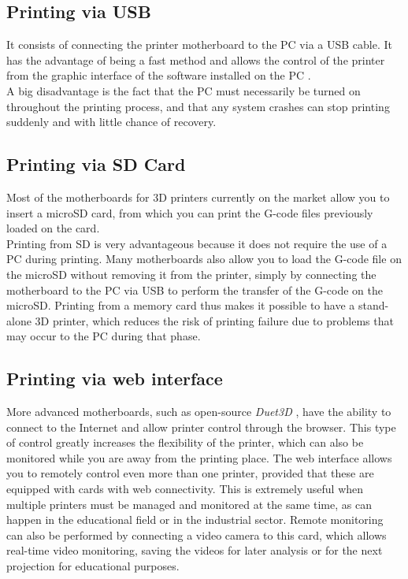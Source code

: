\subsection{Printing via USB}
It consists of connecting the printer motherboard to the PC via a USB cable.
It has the advantage of being a fast method and allows the control of the printer from the graphic interface of the software installed on the PC \parencite{Reference2}. \\
A big disadvantage is the fact that the PC must necessarily be turned on throughout the printing process, and that any system crashes can stop printing suddenly and with little chance of recovery.

\subsection{Printing via SD Card}
Most of the motherboards for 3D printers currently on the market allow you to insert a microSD card, from which you can print the G-code files previously loaded on the card. \\
Printing from SD is very advantageous because it does not require the use of a PC during printing.
Many motherboards also allow you to load the G-code file on the microSD without removing it from the printer, simply by connecting the motherboard to the PC via USB to perform the transfer of the G-code on the microSD.
Printing from a memory card thus makes it possible to have a stand-alone 3D printer, which reduces the risk of printing failure due to problems that may occur to the PC during that phase.

\subsection{Printing via web interface}
More advanced motherboards, such as open-source \emph{Duet3D} \parencite{Reference3}, have the ability to connect to the Internet and allow printer control through the browser. This type of control greatly increases the flexibility of the printer, which can also be monitored while you are away from the printing place.
The web interface allows you to remotely control even more than one printer, provided that these are equipped with cards with web connectivity. This is extremely useful when multiple printers must be managed and monitored at the same time, as can happen in the educational field or in the industrial sector. Remote monitoring can also be performed by connecting a video camera to this card, which allows real-time video monitoring, saving the videos for later analysis or for the next projection for educational purposes.

